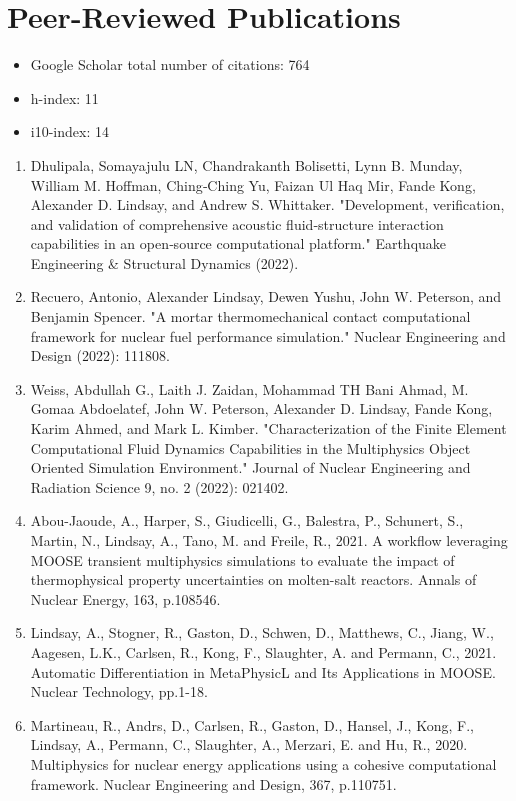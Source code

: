 \section{Peer-Reviewed Publications}
\begin{itemize}
\item Google Scholar total number of citations: 764
\item h-index: 11
\item i10-index: 14
\end{itemize}

\begin{enumerate}
  \item Dhulipala, Somayajulu LN, Chandrakanth Bolisetti, Lynn B. Munday, William M. Hoffman, Ching‐Ching Yu, Faizan Ul Haq Mir, Fande Kong, Alexander D. Lindsay, and Andrew S. Whittaker. "Development, verification, and validation of comprehensive acoustic fluid‐structure interaction capabilities in an open‐source computational platform." Earthquake Engineering \& Structural Dynamics (2022).
  \item Recuero, Antonio, Alexander Lindsay, Dewen Yushu, John W. Peterson, and Benjamin Spencer. "A mortar thermomechanical contact computational framework for nuclear fuel performance simulation." Nuclear Engineering and Design (2022): 111808.
  \item Weiss, Abdullah G., Laith J. Zaidan, Mohammad TH Bani Ahmad, M. Gomaa Abdoelatef, John W. Peterson, Alexander D. Lindsay, Fande Kong, Karim Ahmed, and Mark L. Kimber. "Characterization of the Finite Element Computational Fluid Dynamics Capabilities in the Multiphysics Object Oriented Simulation Environment." Journal of Nuclear Engineering and Radiation Science 9, no. 2 (2022): 021402.
  \item Abou-Jaoude, A., Harper, S., Giudicelli, G., Balestra, P., Schunert, S., Martin, N., Lindsay, A., Tano, M. and Freile, R., 2021. A workflow leveraging MOOSE transient multiphysics simulations to evaluate the impact of thermophysical property uncertainties on molten-salt reactors. Annals of Nuclear Energy, 163, p.108546.
  \item Lindsay, A., Stogner, R., Gaston, D., Schwen, D., Matthews, C., Jiang, W., Aagesen, L.K., Carlsen, R., Kong, F., Slaughter, A. and Permann, C., 2021. Automatic Differentiation in MetaPhysicL and Its Applications in MOOSE. Nuclear Technology, pp.1-18.
  \item Martineau, R., Andrs, D., Carlsen, R., Gaston, D., Hansel, J., Kong, F., Lindsay, A., Permann, C., Slaughter, A., Merzari, E. and Hu, R., 2020. Multiphysics for nuclear energy applications using a cohesive computational framework. Nuclear Engineering and Design, 367, p.110751.

\end{enumerate}
